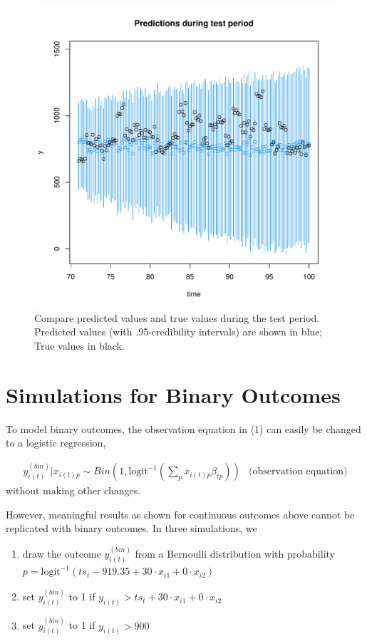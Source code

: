\documentclass{article}
\begin{document}
\begin{figure}
	\centering
	\includegraphics[width=\textwidth]{compare_predictions_with_simulated_data.pdf}
	\caption{Compare predicted values and true values during the test period. Predicted values (with .95-credibility intervals) are shown in blue; True values in black.}
	\label{fig:fig4}
\end{figure}

\section{Simulations for Binary Outcomes}\label{sec:binary}

To model binary outcomes, the observation equation in (1) can easily be changed to a logistic regression,

\begin{eqnarray}
y^{(bin)}_{i(t)} | x_{i(t)p} \sim Bin(1, \textrm{logit}^{-1}(\sum_p x_{i(t)p} \beta_{tp})) & \textrm{(observation equation)}
\end{eqnarray}
without making other changes.

However, meaningful results as shown for continuous outcomes above cannot be replicated with binary outcomes. In three simulations, we 

\begin{enumerate}
    \item draw the outcome $y^{(bin)}_{i(t)}$ from a Bernoulli distribution with probability $p = \textrm{logit}^{-1}(ts_t - 919.35 + 30 \cdot x_{i1} + 0 \cdot x_{i2})$
    \item set $y^{(bin)}_{i(t)}$ to 1 if $y_{i(t)} > ts_t + 30 \cdot x_{i1} + 0 \cdot x_{i2}$
    \item set $y^{(bin)}_{i(t)}$ to 1 if $y_{i(t)} > 900$
\end{enumerate}
\end{document}
